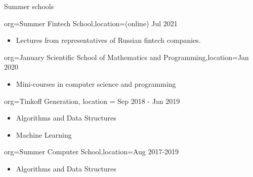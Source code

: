 \documentclass{resume}
\begin{document}
\begin{ResumeSection}{Summer schools}
    \begin{ResumeSubsection}{org=Summer Fintech School,location={(online) Jul 2021}}
        \begin{itemize}
            \item Lectures from representatives of Russian fintech companies.
        \end{itemize}
    \end{ResumeSubsection}
    \begin{ResumeSubsection}{org=January Scientific School of Mathematics and Programming,location={Jan 2020}}
        \begin{itemize}
            \item Mini-courses in computer science and programming
        \end{itemize}
    \end{ResumeSubsection}
    \begin{ResumeSubsection}{org={Tinkoff Generation}, location = {Sep 2018 - Jan 2019}}
        \begin{itemize}
            \item Algorithms and Data Structures
            \item Machine Learning
        \end{itemize}
    \end{ResumeSubsection}
    \begin{ResumeSubsection}{org=Summer Computer School,location={Aug 2017-2019}}
        \begin{itemize}
            \item Algorithms and Data Structures
        \end{itemize}
    \end{ResumeSubsection}
\end{ResumeSection}
\end{document}
